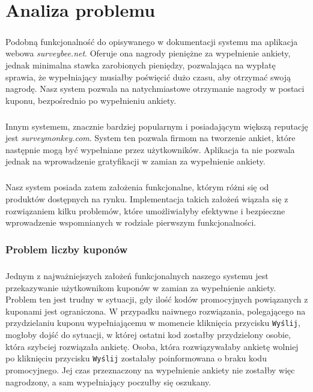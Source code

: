 \chapter{Analiza problemu}

\paragraph{}
Podobną funkcjonalność do opisywanego w dokumentacji systemu ma aplikacja webowa \textit{surveybee.net}. Oferuje ona nagrody pieniężne za wypełnienie ankiety, jednak minimalna stawka zarobionych pieniędzy, pozwalająca na wypłatę sprawia, że wypełniający musiałby poświęcić dużo czasu, aby otrzymać swoją nagrodę. Nasz system pozwala na natychmiastowe otrzymanie nagrody w postaci kuponu, bezpośrednio po wypełnieniu ankiety.

\paragraph{}
Innym systemem, znacznie bardziej popularnym i posiadającym większą reputację jest \textit{surveymonkey.com}. System ten pozwala firmom na tworzenie ankiet, które następnie mogą być wypełniane przez użytkowników. Aplikacja ta nie pozwala jednak na wprowadzenie gratyfikacji w zamian za wypełnienie ankiety.

\paragraph{}
Nasz system posiada zatem założenia funkcjonalne, którym różni się od produktów dostępnych na rynku. Implementacja takich założeń wiązała się z rozwiązaniem kilku problemów, które umożliwiałyby efektywne i bezpieczne wprowadzenie wspomnianych w rodziale pierwszym funkcjonalności.


\subsection{Problem liczby kuponów}
\paragraph{}
Jednym z najważniejszych założeń funkcjonalnych naszego systemu jest przekazywanie użytkownikom kuponów w zamian za wypełnienie ankiety. Problem ten jest trudny w sytuacji, gdy ilość kodów promocyjnych powiązanych z kuponami jest ograniczona. W przypadku naiwnego rozwiązania, polegającego na przydzielaniu kuponu wypełniającemu w momencie kliknięcia przycisku \texttt{Wyślij}, mogłoby dojść do sytuacji, w której ostatni kod zostałby przydzielony osobie, która szybciej rozwiązała ankietę. Osoba, która rozwiązywałaby ankietę wolniej po kliknięciu przycisku \texttt{Wyślij} zostałaby poinformowana o braku kodu promocyjnego. Jej czas przeznaczony na wypełnienie ankiety nie zostałby więc nagrodzony, a sam wypełniający poczułby się oszukany.

